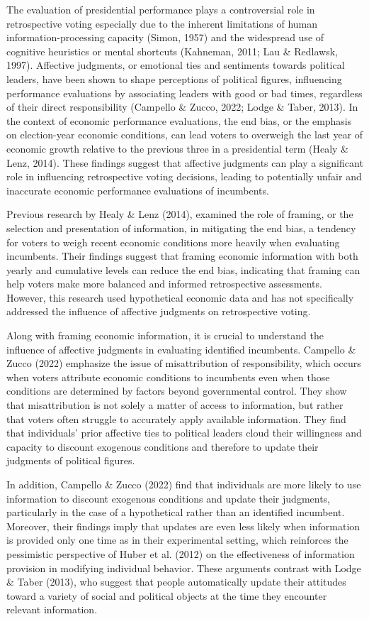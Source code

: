 \documentclass[
]{article}
\begin{document}
The evaluation of presidential performance plays a controversial role in
retrospective voting especially due to the inherent limitations of human
information-processing capacity (Simon, 1957) and the widespread use of
cognitive heuristics or mental shortcuts (Kahneman, 2011; Lau \&
Redlawsk, 1997). Affective judgments, or emotional ties and sentiments
towards political leaders, have been shown to shape perceptions of
political figures, influencing performance evaluations by associating
leaders with good or bad times, regardless of their direct
responsibility (Campello \& Zucco, 2022; Lodge \& Taber, 2013). In the
context of economic performance evaluations, the end bias, or the
emphasis on election-year economic conditions, can lead voters to
overweigh the last year of economic growth relative to the previous
three in a presidential term (Healy \& Lenz, 2014). These findings
suggest that affective judgments can play a significant role in
influencing retrospective voting decisions, leading to potentially
unfair and inaccurate economic performance evaluations of incumbents.

Previous research by Healy \& Lenz (2014), examined the role of framing,
or the selection and presentation of information, in mitigating the end
bias, a tendency for voters to weigh recent economic conditions more
heavily when evaluating incumbents. Their findings suggest that framing
economic information with both yearly and cumulative levels can reduce
the end bias, indicating that framing can help voters make more balanced
and informed retrospective assessments. However, this research used
hypothetical economic data and has not specifically addressed the
influence of affective judgments on retrospective voting.

Along with framing economic information, it is crucial to understand the
influence of affective judgments in evaluating identified incumbents.
Campello \& Zucco (2022) emphasize the issue of misattribution of
responsibility, which occurs when voters attribute economic conditions
to incumbents even when those conditions are determined by factors
beyond governmental control. They show that misattribution is not solely
a matter of access to information, but rather that voters often struggle
to accurately apply available information. They find that individuals'
prior affective ties to political leaders cloud their willingness and
capacity to discount exogenous conditions and therefore to update their
judgments of political figures.

In addition, Campello \& Zucco (2022) find that individuals are more
likely to use information to discount exogenous conditions and update
their judgments, particularly in the case of a hypothetical rather than
an identified incumbent. Moreover, their findings imply that updates are
even less likely when information is provided only one time as in their
experimental setting, which reinforces the pessimistic perspective of
Huber et al. (2012) on the effectiveness of information provision in
modifying individual behavior. These arguments contrast with Lodge \&
Taber (2013), who suggest that people automatically update their
attitudes toward a variety of social and political objects at the time
they encounter relevant information.
\end{document}
